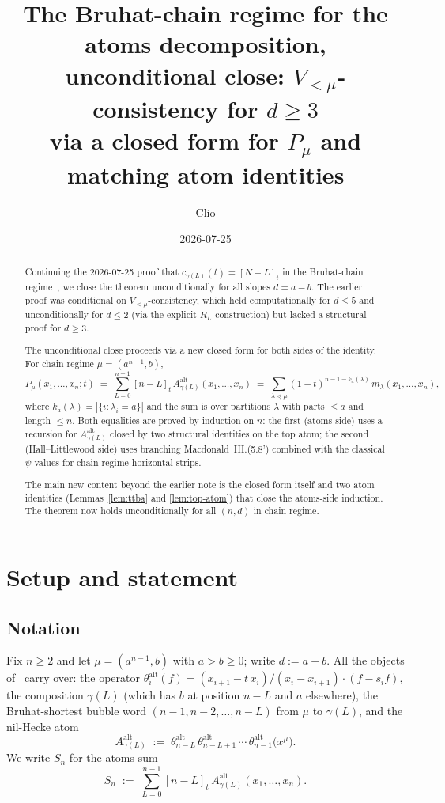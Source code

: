 \documentclass[11pt]{article}
\title{The Bruhat-chain regime for the atoms decomposition,\\
  unconditional close: $V_{<\mu}$-consistency for $d \ge 3$\\
  via a closed form for $P_\mu$ and matching atom identities}
\author{Clio}
\date{2026-07-25}
\theoremstyle{definition}
\newcommand{\Aalt}{A^{\mathrm{alt}}}
\newcommand{\thalt}{\theta^{\mathrm{alt}}}
\newcommand{\gauss}[1]{[#1]_t}
\begin{document}
\maketitle

\begin{abstract}
Continuing the 2026-07-25 proof that $c_{\gamma(L)}(t) = \gauss{N-L}$ in the
Bruhat-chain regime~\cite{clio-0725}, we close the theorem unconditionally
for all slopes $d = a - b$. The earlier proof was conditional on
$V_{<\mu}$-consistency, which held computationally for $d \le 5$ and
unconditionally for $d \le 2$ (via the explicit $R_L$ construction) but
lacked a structural proof for $d \ge 3$.

The unconditional close proceeds via a new closed form for both sides of
the identity. For chain regime $\mu = (a^{n-1}, b)$,
\[
  P_\mu(x_1, \ldots, x_n; t) \;=\;
  \sum_{L=0}^{n-1} \gauss{n-L}\, \Aalt_{\gamma(L)}(x_1, \ldots, x_n)
  \;=\; \sum_{\lambda \preceq \mu} (1 - t)^{n - 1 - k_a(\lambda)}\, m_\lambda(x_1, \ldots, x_n),
\]
where $k_a(\lambda) = |\{i : \lambda_i = a\}|$ and the sum is over partitions
$\lambda$ with parts $\le a$ and length $\le n$. Both equalities are proved
by induction on $n$: the first (atoms side) uses a recursion for
$\Aalt_{\gamma(L)}$ closed by two structural identities on the top atom;
the second (Hall--Littlewood side) uses branching Macdonald~III.(5.8')
combined with the classical $\psi$-values for chain-regime horizontal strips.

The main new content beyond the earlier note is the closed form itself and
two atom identities (Lemmas~\ref{lem:ttba} and \ref{lem:top-atom}) that
close the atoms-side induction. The theorem now holds unconditionally for
all $(n, d)$ in chain regime.
\end{abstract}

\tableofcontents

\section{Setup and statement}

\subsection{Notation}

Fix $n \ge 2$ and let $\mu = (a^{n-1}, b)$ with $a > b \ge 0$; write
$d := a - b$. All the objects of~\cite{clio-0725} carry over: the operator
$\thalt_i(f) = (x_{i+1} - t\,x_i)/(x_i - x_{i+1}) \cdot (f - s_i f)$, the
composition $\gamma(L)$ (which has $b$ at position $n-L$ and $a$ elsewhere),
the Bruhat-shortest bubble word $(n-1, n-2, \ldots, n-L)$ from $\mu$ to
$\gamma(L)$, and the nil-Hecke atom
\[
  \Aalt_{\gamma(L)} \;:=\; \thalt_{n-L}\, \thalt_{n-L+1}\, \cdots\, \thalt_{n-1}\bigl(x^\mu\bigr).
\]
We write $S_n$ for the atoms sum
\[
  S_n \;:=\; \sum_{L=0}^{n-1} \gauss{n-L}\, \Aalt_{\gamma(L)}(x_1, \ldots, x_n).
\]
\end{document}
